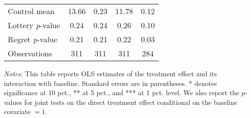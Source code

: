 \begin{table}[htbp]
{\begin{threeparttable}
\begin{tabular}{l*{4}{c}}
Control mean    &    13.66         &     0.23         &    11.78         &     0.12         \\
Lottery \emph{p}-value&     0.24         &     0.24         &     0.26         &     0.10         \\
Regret \emph{p}-value&     0.21         &     0.21         &     0.22         &     0.03         \\
Observations    &      311         &      311         &      311         &      284         \\
\bottomrule \end{tabular} \begin{tablenotes}[flushleft] \footnotesize \item \emph{Notes:} This table reports OLS estimates of the treatment effect and its interaction with baseline. Standard errors are in parentheses. * denotes significance at 10 pct., ** at 5 pct., and *** at 1 pct. level. We also report the \(p\)-values for joint tests on the direct treatment effect conditional on the baseline covariate $= 1$. \end{tablenotes} \end{threeparttable} } \end{table}

